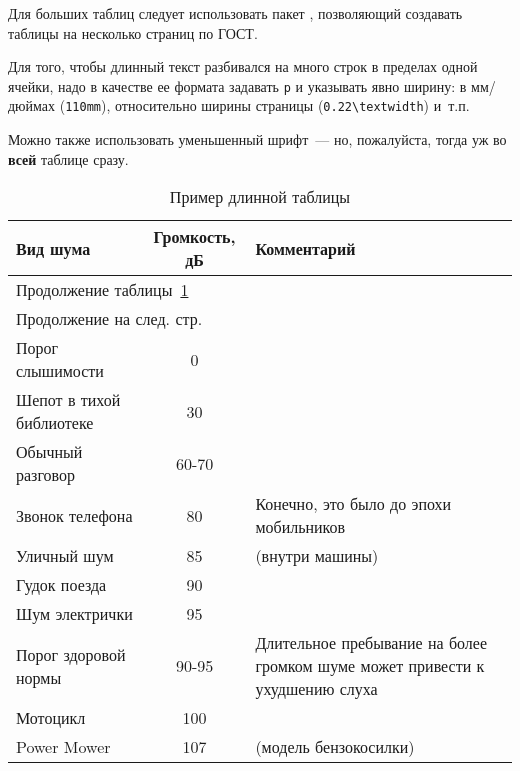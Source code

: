 \documentclass[utf8]{G7-32} %
\begin{document}
Для больших таблиц следует использовать пакет , позволяющий создавать
таблицы на несколько страниц по ГОСТ.

Для того, чтобы длинный текст разбивался на много строк в пределах одной ячейки, надо в
качестве ее формата задавать \texttt{p} и указывать явно ширину: в мм/дюймах
(\texttt{110mm}), относительно ширины страницы (\texttt{0.22\textbackslash textwidth})
и~т.п.

Можно также использовать уменьшенный шрифт~--- но, пожалуйста, тогда уж во \textbf{всей}
таблице сразу.

\begin{center}
  \begin{longtable}{|p{}|c|p{}|}
    \caption{Пример длинной таблицы}
    \label{tab:longtable}\\
    \hline
    Вид шума & Громкость, дБ & Комментарий \\
    \hline \endfirsthead
    \multicolumn{3}{l}{Продолжение таблицы~\ref{tab:longtable}} \\
    \hline \endhead
    \hline \multicolumn{3}{l}{Продолжение на след. стр.} \\
    \endfoot
    \hline \endlastfoot
    Порог слышимости             & 0     &                                                \\
    \hline
    Шепот в тихой библиотеке     & 30    &                                                \\
    Обычный разговор             & 60-70 &                                                \\
    Звонок телефона              & 80    & \small{Конечно, это было до эпохи мобильников} \\
    Уличный шум                  & 85    & \small{(внутри машины)}                        \\
    Гудок поезда                 & 90    &                                                \\
    Шум электрички               & 95    &                                                \\
    \hline
    Порог здоровой нормы         & 90-95 & \small{Длительное пребывание на более
    громком шуме может привести к ухудшению слуха}                                        \\
    \hline
    Мотоцикл                     & 100   &                                                \\
    Power Mower                  & 107   & \small{(модель бензокосилки)}                  \\

\end{longtable}
\end{center}
\end{document}
